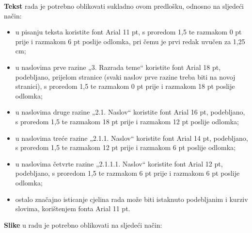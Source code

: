 \documentclass[]{foi} %
\begin{document}
\textbf{Tekst} rada je potrebno oblikovati sukladno ovom predlošku, odnosno na sljedeći način:
\begin{itemize}
	\item u pisanju teksta koristite font Arial 11 pt, s proredom 1,5 te razmakom 0 pt prije i razmakom 6 pt poslije odlomka, pri čemu je prvi redak uvučen za 1,25 cm;

	\item u naslovima prve razine „3. Razrada teme“ koristite font Arial 18 pt, podebljano, prijelom stranice (svaki naslov prve razine treba biti na novoj stranici), s proredom 1,5 te razmakom 0 pt prije i razmakom 18 pt poslije odlomka;

	\item u naslovima druge razine „2.1. Naslov“ koristite font Arial 16 pt, podebljano, s proredom 1,5 te razmakom 18 pt prije i razmakom 12 pt poslije odlomka;

	\item u naslovima treće razine „2.1.1. Naslov“ koristite font Arial 14 pt, podebljano, s proredom 1,5 te razmakom 12 pt prije i razmakom 6 pt poslije odlomka;

	\item u naslovima četvrte razine „2.1.1.1. Naslov“ koristite font Arial 12 pt, podebljano, s proredom 1,5 te razmakom 6 pt prije i razmakom 6 pt poslije odlomka;

	\item ostalo značajno isticanje cjelina rada može biti istaknuto podebljanim i kurziv slovima, korištenjem fonta Arial 11 pt.
\end{itemize}


\textbf{Slike} u radu je potrebno oblikovati na sljedeći način:
\end{document}
